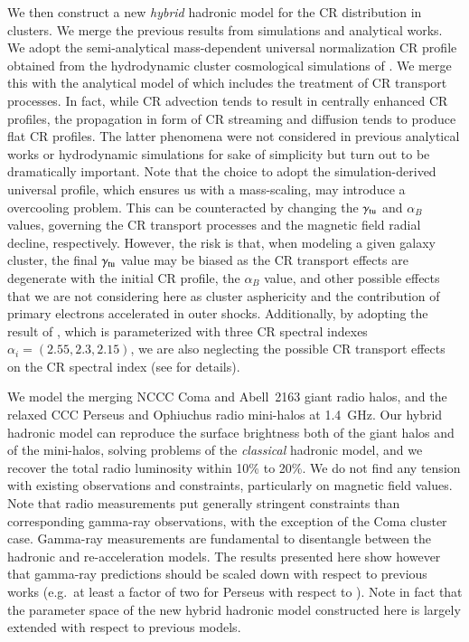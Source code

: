 \documentclass[traditabstract]{aa}
\begin{document}
We then construct a new \emph{hybrid} hadronic model for the CR distribution in clusters. We merge the previous results from simulations and analytical works. We adopt the semi-analytical mass-dependent universal normalization CR profile obtained from the hydrodynamic cluster cosmological simulations of \cite{2010MNRAS.409..449P}. We merge this with the analytical model of \cite{2011A&A...527A..99E} which includes the treatment of CR transport processes. In fact, while CR advection tends to result in centrally enhanced CR profiles, the propagation in form of CR streaming and diffusion tends to produce flat CR profiles. The latter phenomena were not considered in previous analytical works or hydrodynamic simulations for sake of simplicity but turn out to be dramatically important. Note that the choice to adopt the \cite{2010MNRAS.409..449P} simulation-derived universal profile, which ensures us with a mass-scaling, may introduce a overcooling problem. This can be counteracted by changing the $\gamma_{\rm{tu}}$ and $\alpha_B$ values, governing the CR transport processes and the magnetic field radial decline, respectively. However, the risk is that, when modeling a given galaxy cluster, the final $\gamma_{\rm{tu}}$ value may be biased as the CR transport effects are degenerate with the initial CR profile, the $\alpha_B$ value, and other possible effects that we are not considering here as cluster asphericity and the contribution of primary electrons accelerated in outer shocks. Additionally, by adopting the result of \cite{2010MNRAS.409..449P}, which is parameterized with three CR spectral indexes $\alpha_{i}=(2.55,2.3,2.15)$, we are also neglecting the possible CR transport effects on the CR spectral index (see \citealp{2011A&A...527A..99E} for details). 

We model the merging NCCC Coma and Abell~2163 giant radio halos, and the relaxed CCC Perseus and Ophiuchus radio mini-halos at 1.4~GHz. 
Our hybrid hadronic model can reproduce the surface brightness both of the giant halos and of the mini-halos, solving problems of the \emph{classical} hadronic model, and we recover the total radio luminosity within 10\% to 20\%. We do not find any tension with existing observations and constraints, particularly on magnetic field values. Note that radio measurements put generally stringent constraints than corresponding gamma-ray observations, with the exception of the Coma cluster case. Gamma-ray measurements are fundamental to disentangle between the hadronic and re-acceleration models. The results presented here show however that gamma-ray predictions should be scaled down with respect to previous works (e.g.~at least a factor of two for Perseus with respect to \citealp{2010MNRAS.409..449P}). Note in fact that the parameter space of the new hybrid hadronic model constructed here is largely extended with respect to previous models.
\end{document}
